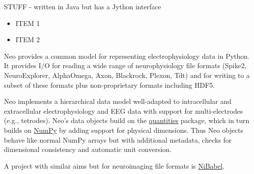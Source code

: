 \begin{multicols}{3}

STUFF - written in Java but has a Jython interface

\begin{itemize}[nolistsep,topsep=0em,leftmargin=1pc]
\item ITEM 1
\item ITEM 2
\end{itemize}


%


Neo provides a common model for representing
electrophysiology data in Python. It provides I/O for reading a wide
range of neurophysiology file formats (Spike2,
NeuroExplorer, AlphaOmega, Axon, Blackrock, Plexon, Tdt) and for
writing to a subset of these formats plus non-proprietary formats
including HDF5.


Neo implements a hierarchical data model well-adapted to intracellular
and extracellular electrophysiology and EEG data with support for
multi-electrodes (e.g., tetrodes).  Neo's data objects build on
the \href{http://pypi.python.org/pypi/quantities}{quantities} package,
which in turn builds on \href{http://www.numpy.org}{NumPy} by adding
support for physical dimensions. Thus Neo objects behave like
normal NumPy arrays but with additional metadata, checks for
dimensional consistency and automatic unit conversion.

A project with similar aims but for neuroimaging file formats is
\href{http://www.nipy.org/nibabel}{NiBabel}.



\end{multicols}
